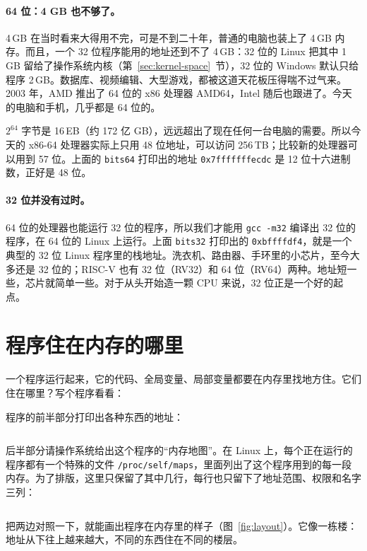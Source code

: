 \paragraph{64 位：4 GB 也不够了。}
4\,GB 在当时看来大得用不完，可是不到二十年，普通的电脑也装上了 4\,GB 内存。而且，一个 32 位程序能用的地址还到不了 4\,GB：32 位的 Linux 把其中 1\,GB 留给了操作系统内核（第~\ref{sec:kernel-space}~节），32 位的 Windows 默认只给程序 2\,GB。数据库、视频编辑、大型游戏，都被这道天花板压得喘不过气来。2003 年，AMD 推出了 64 位的 x86 处理器 AMD64，Intel 随后也跟进了。今天的电脑和手机，几乎都是 64 位的。

$2^{64}$ 字节是 16\,EB（约 172 亿 GB），远远超出了现在任何一台电脑的需要。所以今天的 x86-64 处理器实际上只用 48 位地址，可以访问 256\,TB；比较新的处理器可以用到 57 位。上面的 \texttt{bits64} 打印出的地址 \texttt{0x7fffffffecdc} 是 12 位十六进制数，正好是 48 位。

\paragraph{32 位并没有过时。}
64 位的处理器也能运行 32 位的程序，所以我们才能用 \texttt{gcc -m32} 编译出 32 位的程序，在 64 位的 Linux 上运行。上面 \texttt{bits32} 打印出的 \texttt{0xbffffdf4}，就是一个典型的 32 位 Linux 程序里的栈地址。洗衣机、路由器、手环里的小芯片，至今大多还是 32 位的；RISC-V 也有 32 位（RV32）和 64 位（RV64）两种。地址短一些，芯片就简单一些。对于从头开始造一颗 CPU 来说，32 位正是一个好的起点。

\section{程序住在内存的哪里}
\label{sec:layout}

一个程序运行起来，它的代码、全局变量、局部变量都要在内存里找地方住。它们住在哪里？写个程序看看：


程序的前半部分打印出各种东西的地址：
\inputminted[linenos=false]{text}{code/ch04/out/layout.txt}

后半部分请操作系统给出这个程序的“内存地图”。在 Linux 上，每个正在运行的程序都有一个特殊的文件 \texttt{/proc/self/maps}，里面列出了这个程序用到的每一段内存。为了排版，这里只保留了其中几行，每行也只留下了地址范围、权限和名字三列：
\inputminted[linenos=false]{text}{code/ch04/out/layout_maps.txt}

把两边对照一下，就能画出程序在内存里的样子（图~\ref{fig:layout}）。它像一栋楼：地址从下往上越来越大，不同的东西住在不同的楼层。

